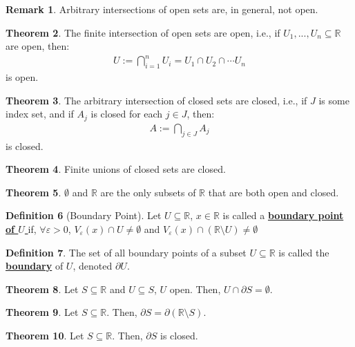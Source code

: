 \documentclass[reqno,11pt]{amsart}
\theoremstyle{definition}
\newtheorem{theorem}{Theorem}
\theoremstyle{definition}
\newtheorem{definition}[theorem]{Definition}
\newtheorem{remark}[theorem]{Remark}
\theoremstyle{remark}
\newcommand{\R}{\mathbb{R}}
\newcommand{\eps}{\varepsilon}
\newcommand{\dfn}[1]{\underline{\textbf{#1}}}
\begin{document}
\begin{remark}
	Arbitrary intersections of open sets are, in general, not open.
\end{remark}

\begin{theorem}
	The finite intersection of open sets are open, i.e., if $U_1, ..., U_n \subseteq \R$ are open, then: 
	\begin{align}
		U := \bigcap_{i=1}^n U_i = U_1 \cap U_2 \cap \cdots U_n 	
	\end{align}
	is open.
\end{theorem}

\begin{theorem}
	The arbitrary intersection of closed sets are closed, i.e., if $J$ is some index set, and if $A_j$ is closed for each $j \in J$, then:
	\begin{align}
		A := \bigcap_{j \in J} A_j 	
	\end{align}
	is closed.
\end{theorem}

\begin{theorem}
	Finite unions of closed sets are closed. 
\end{theorem}
\begin{theorem}
	$\emptyset$ and $\R$ are the only subsets of $\R$ that are both open and closed. 
\end{theorem}

\begin{definition}[Boundary Point]
	Let $U \subseteq \R$, $x \in \R$ is called a \dfn{boundary point of $U$ } if, $\forall $$\eps > 0$, $V_\eps(x) \cap U \neq \emptyset$ and $V_\eps(x) \cap ( \R \setminus U) \neq \emptyset$ 
\end{definition}

\begin{definition}
	The set of all boundary points of a subset $U \subseteq \R$ is called the \dfn{boundary} of $U$, denoted $\partial U$.
\end{definition}

\begin{theorem}
	Let $S \subseteq \R$ and $U \subseteq S$, $U$ open. Then, $U \cap \partial S = \emptyset$. 
\end{theorem}

\begin{theorem}
	Let $S \subseteq \R$. Then, $\partial S = \partial ( \R \setminus S) $.
\end{theorem}

\begin{theorem}
	Let $S \subseteq \R$. Then, $\partial S$ is closed.
\end{theorem}
\end{document}
